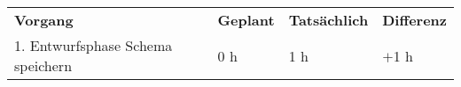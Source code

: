 
\begin{tabularx}{\textwidth}{Xlll}
\rowcolor{heading}\textbf{Vorgang} & \textbf{Geplant} & \textbf{Tatsächlich} & \textbf{Differenz} \\
1. Entwurfsphase Schema speichern & 0 h & 1 h   & $+$1 h   \\
\end{tabularx}
